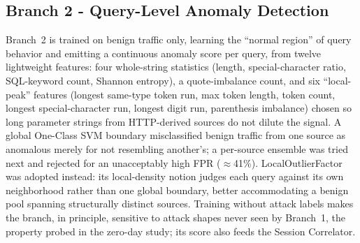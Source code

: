 \documentclass[conference]{IEEEtran}
\begin{document}
\subsection{Branch 2 - Query-Level Anomaly Detection}
Branch~2 is trained on benign traffic only, learning the ``normal region'' of query behavior and emitting a continuous anomaly score per query, from twelve lightweight features: four whole-string statistics (length, special-character ratio, SQL-keyword count, Shannon entropy), a quote-imbalance count, and six ``local-peak'' features (longest same-type token run, max token length, token count, longest special-character run, longest digit run, parenthesis imbalance) chosen so long parameter strings from HTTP-derived sources do not dilute the signal. A global One-Class SVM boundary misclassified benign traffic from one source as anomalous merely for not resembling another's; a per-source ensemble was tried next and rejected for an unacceptably high FPR ($\approx$41\%). LocalOutlierFactor was adopted instead: its local-density notion judges each query against its own neighborhood rather than one global boundary, better accommodating a benign pool spanning structurally distinct sources. Training without attack labels makes the branch, in principle, sensitive to attack shapes never seen by Branch~1, the property probed in the zero-day study; its score also feeds the Session Correlator.
\end{document}
